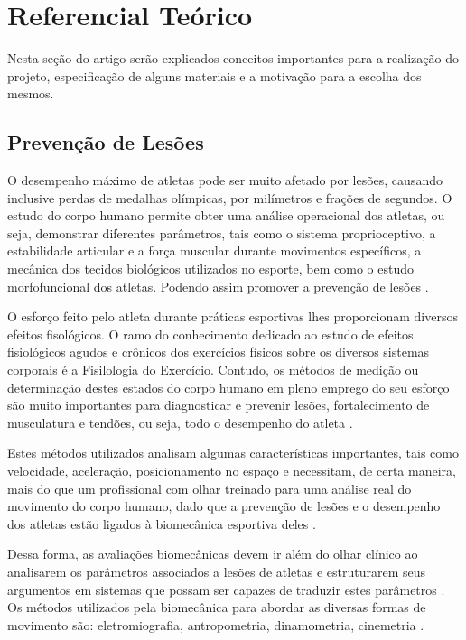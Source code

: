 
\chapter[Referencial Teórico]{Referencial Teórico}
Nesta seção do artigo serão explicados conceitos importantes para a realização do projeto, especificação de alguns materiais e a motivação para a escolha dos mesmos.  

\section{Prevenção de Lesões}

O desempenho máximo de atletas pode ser muito afetado por lesões, causando inclusive perdas de medalhas olímpicas, por milímetros e frações de segundos. O estudo do corpo humano permite obter uma análise operacional dos atletas, ou seja, demonstrar diferentes parâmetros, tais como o sistema proprioceptivo, a estabilidade articular e a força muscular durante movimentos específicos, a mecânica dos tecidos biológicos utilizados no esporte, bem como o estudo morfofuncional dos atletas. Podendo assim promover a prevenção de lesões \cite{miziara2014}.  

O esforço feito pelo atleta durante práticas esportivas lhes proporcionam diversos efeitos fisológicos. O ramo do conhecimento dedicado ao estudo de efeitos fisiológicos agudos e crônicos dos exercícios físicos sobre os diversos sistemas corporais é a Fisilologia do Exercício. Contudo, os métodos de medição ou determinação destes estados do corpo humano em pleno emprego do seu esforço são muito importantes para diagnosticar e prevenir lesões, fortalecimento de musculatura e tendões, ou seja, todo o desempenho do atleta \cite{rocha2005}.

Estes métodos utilizados analisam algumas características importantes, tais como velocidade, aceleração, posicionamento no espaço e necessitam, de certa maneira, mais do que um profissional com olhar treinado para uma análise real do movimento do corpo humano, dado que a prevenção de lesões e o desempenho dos atletas estão ligados à biomecânica esportiva deles \cite{amadio2000}.

Dessa forma, as avaliações biomecânicas devem ir além do olhar clínico ao analisarem os parâmetros associados a lesões de atletas e estruturarem seus argumentos em sistemas que possam ser capazes de traduzir estes parâmetros \cite{miziara2014}. Os métodos utilizados pela biomecânica para abordar as diversas formas de movimento são: eletromiografia, antropometria, dinamometria, cinemetria \cite{amadio2007}.

